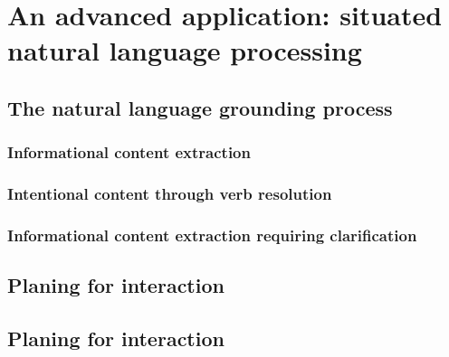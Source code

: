 \chapter{An advanced application: situated natural language processing}
\label{chapter|dialogs}

\section{The natural language grounding process}
\label{sect|dialogs}

\subsection{Informational content extraction}
\subsection{Intentional content through verb resolution}
\subsection{Informational content extraction requiring clarification}
\label{dialogs|disamb}

\section{Planing for interaction}
\label{sect|planing-for-interaction}


\section{Planing for interaction}
\label{sect|planing-for-interaction}


